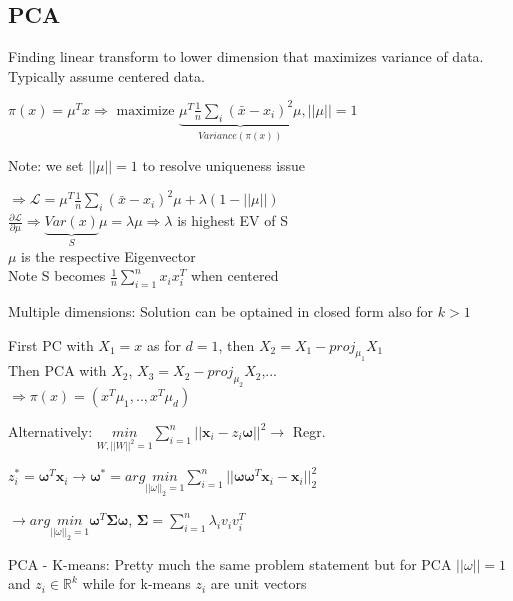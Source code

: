 \subsection{PCA}

Finding linear transform to lower dimension that maximizes variance of data. Typically assume centered data.

$\pi(x) = \mu^Tx \Rightarrow \text{ maximize } \underbrace{\mu^T\frac{1}{n}\sum_i(\bar{x} -x_i)^2\mu}_{Variance(\pi(x))}, ||\mu|| = 1$

Note: we set $||\mu|| = 1$ to resolve uniqueness issue
\begin{center}
    $\Rightarrow \mathcal{L} = \mu^T\frac{1}{n}\sum_i(\bar{x} -x_i)^2\mu + \lambda(1-||\mu||)$\\
    $\frac{\partial \mathcal{L}}{\partial \mu} \Rightarrow \underbrace{Var(x)}_{S}\mu = \lambda \mu \Rightarrow \lambda$ is highest EV of S\\
    $\mu$ is the respective Eigenvector\\
    Note S becomes $\frac{1}{n}\sum_{i=1}^nx_ix_i^T$ when centered
\end{center}
Multiple dimensions: Solution can be optained in closed form also for $k> 1$
\begin{center}
    First PC with $X_1 = x$ as for $d = 1$, then $X_2 = X_1-proj_{\mu_1}X_1$\\
    Then PCA with $X_2$, $X_3 = X_2 - proj_{\mu_2}X_2$,... \\$\Rightarrow \pi(x) = (x^T\mu_1,..,x^T\mu_d)$
\end{center}

Alternatively: $\underset{W, ||W||^2 = 1}{min}\sum_{i=1}^n||\boldsymbol{x}_i - z_i\boldsymbol{\omega}||^2 \rightarrow$ Regr.

$z_i^* = \boldsymbol{\omega}^T\boldsymbol{x}_i \rightarrow \boldsymbol{\omega}^* = arg \underset{||\omega||_2 = 1}{min}\sum_{i=1}^n||\boldsymbol{\omega}\boldsymbol{\omega}^T\boldsymbol{x}_i - \boldsymbol{x}_i||^2_2$

$\rightarrow arg \underset{||\omega||_2 = 1}{min}\boldsymbol{\omega}^T\boldsymbol{\Sigma}\boldsymbol{\omega}$, $\boldsymbol{\Sigma} = \sum_{i=1}^n \lambda_iv_iv_i^T$

PCA - K-means: Pretty much the same problem statement but for PCA $||\omega|| = 1$ and $z_i \in \mathbb{R}^k$ while for k-means $z_i$ are unit vectors


